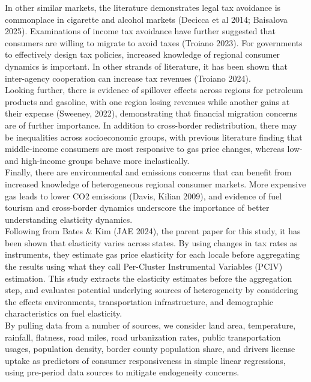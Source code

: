 In other similar markets, the literature demonstrates legal tax avoidance is commonplace in cigarette and alcohol markets (Decicca et al 2014; Baisalova 2025). Examinations of income tax avoidance have further suggested that consumers are willing to migrate to avoid taxes (Troiano 2023). For governments to effectively design tax policies, increased knowledge of regional consumer dynamics is important. In other strands of literature, it has been shown that inter-agency cooperation can increase tax revenues (Troiano 2024). \\

Looking further, there is evidence of spillover effects across regions for petroleum products and gasoline, with one region losing revenues while another gains at their expense (Sweeney, 2022), demonstrating that financial migration concerns are of further importance. In addition to cross-border redistribution, there may be inequalities across socioeconomic groups, with previous literature finding that middle-income consumers are most responsive to gas price changes, whereas low- and high-income groups behave more inelastically. \\

Finally, there are environmental and emissions concerns that can benefit from increased knowledge of heterogeneous regional consumer markets. More expensive gas leads to lower CO2 emissions (Davis, Kilian 2009), and evidence of fuel tourism and cross-border dynamics underscore the importance of better understanding elasticity dynamics. \\

Following from Bates \& Kim (JAE 2024), the parent paper for this study, it has been shown that elasticity varies across states. By using changes in tax rates as instruments, they estimate gas price elasticity for each locale before aggregating the results using what they call Per-Cluster Instrumental Variables (PCIV) estimation. This study extracts the elasticity estimates before the aggregation step, and evaluates potential underlying sources of heterogeneity by considering the effects environments, transportation infrastructure, and demographic characteristics on fuel elasticity. \\

By pulling data from a number of sources, we consider land area, temperature, rainfall, flatness, road miles, road urbanization rates, public transportation usages, population density, border county population share, and drivers license uptake as predictors of consumer responsiveness in simple linear regressions, using pre-period data sources to mitigate endogeneity concerns. \\

